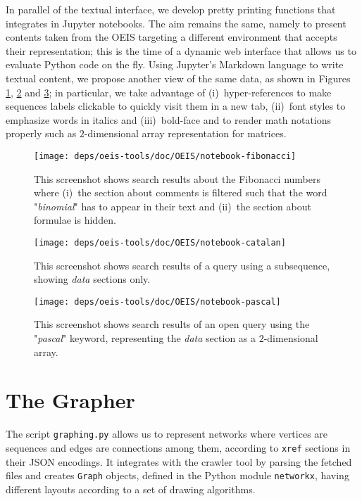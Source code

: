 In parallel of the textual interface, we develop pretty printing functions that
integrates in Jupyter notebooks. The aim remains the same, namely to present
contents taken from the OEIS targeting a different environment that accepts
their representation; this is the time of a dynamic web interface that allows
us to evaluate Python code on the fly. Using Jupyter's Markdown language to
write textual content, we propose another view of the same data, as shown in
Figures \ref{fig:oeis:notebook:fibonacci}, \ref{fig:oeis:notebook:catalan} and
\ref{fig:oeis:notebook:pascal}; in particular, we take advantage of
(i)~hyper-references to make sequences labels clickable to quickly visit them
in a new tab, (ii)~font styles to emphasize words in italics and
(iii)~bold-face and to render math notations properly such as $2$-dimensional
array representation for matrices.
\vfill

\begin{figure}
\texttt{[image: deps/oeis-tools/doc/OEIS/notebook-fibonacci]}
\caption{This screenshot shows search results about the Fibonacci numbers where
(i)~the section about comments is filtered such that the word "\emph{binomial}"
has to appear in their text and (ii)~the section about formulae is hidden.}
\label{fig:oeis:notebook:fibonacci}
\end{figure}

\begin{figure}
\texttt{[image: deps/oeis-tools/doc/OEIS/notebook-catalan]}
\caption{This screenshot shows search results of a query using a subsequence,
showing \emph{data} sections only.}
\label{fig:oeis:notebook:catalan}
\end{figure}

\begin{figure}
\texttt{[image: deps/oeis-tools/doc/OEIS/notebook-pascal]}
\caption{This screenshot shows search results of an open query using the
"\emph{pascal}" keyword, representing the \emph{data} section as a
$2$-dimensional array.  }
\label{fig:oeis:notebook:pascal}
\end{figure}

\section{The Grapher}

The script \verb|graphing.py| allows us to represent networks where vertices
are sequences and edges are connections among them, according to \verb|xref|
sections in their JSON encodings. It integrates with the crawler tool by
parsing the fetched files and creates \verb|Graph| objects, defined in the
Python module \verb|networkx|, having different layouts according to a set of
drawing algorithms.

